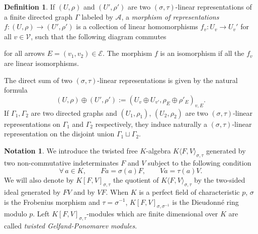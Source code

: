 \documentclass[12pt]{amsart}
\theoremstyle{definition}
\newtheorem{definition}[theorem]{Definition}
\newtheorem{notation}[theorem]{Notation}
\newcommand{\<}{\langle}   %
\renewcommand{\>}{\rangle} %
\begin{document}
\begin{definition}
    If $(U,\rho)$ and $(U',\rho')$ are two $(\sigma,\tau)$-linear representations of a finite directed graph $\Gamma$ labeled by $\mathcal A$, a \textit{morphism of representations} $f:(U,\rho) \to (U',\rho')$ is a collection of linear homomorphisms $f_v:U_v\to U_v'$ for all $v\in \mathcal V$, such that the following diagram commutes
    \begin{center}
    \end{center}
    for all arrows $E = (v_1,v_2) \in \mathcal E$. The morphism $f$ is an isomorphism if all the $f_v$ are linear isomorphisms.
\end{definition}

The direct sum of two $(\sigma,\tau)$-linear representations is given by the natural formula 
\begin{equation*}
    (U,\rho) \oplus (U',\rho') := (U_v\oplus U_{v'}, \rho_E \oplus \rho'_E)_{v,E}.
\end{equation*}
If $\Gamma_1,\Gamma_2$ are two directed graphs and $(U_1,\rho_1)$, $(U_2,\rho_2)$ are two $(\sigma,\tau)$-linear representations on $\Gamma_1$ and $\Gamma_2$ respectively, they induce naturally a $(\sigma,\tau)$-linear representation on the disjoint union $\Gamma_1\sqcup \Gamma_2$.

\begin{notation}
    We introduce the twisted free $K$-algebra $K\langle F,V\rangle_{\sigma,\tau}$ generated by two non-commutative indeterminates $F$ and $V$ subject to the following condition
    \begin{equation*}
        \forall\, a \in K, \qquad Fa = \sigma(a)F, \qquad Va = \tau(a)V.
    \end{equation*}
    We will also denote by $K[F,V]_{\sigma,\tau}$ the quotient of $K\langle F,V\rangle_{\sigma,\tau}$ by the two-sided ideal generated by $FV$ and by $VF$. When $K$ is a perfect field of characteristic $p$, $\sigma$ is the Frobenius morphism and $\tau = \sigma^{-1}$, $K[F,V]_{\sigma,\sigma^{-1}}$ is the Dieudonné ring modulo $p$. Left $K[F,V]_{\sigma,\tau}$-modules which are finite dimensional over $K$ are called \textit{twisted Gelfand-Ponomarev modules}.
\end{notation} 
\end{document}
